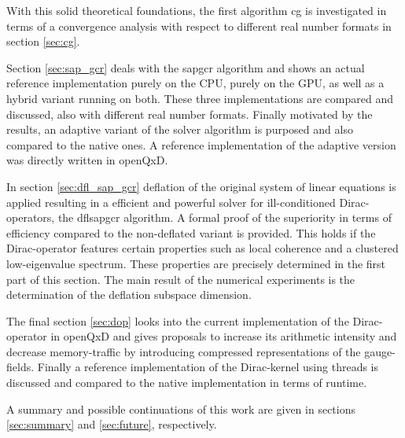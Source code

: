 \documentclass{article}
\theoremstyle{plain} %
\theoremstyle{convention} %
\theoremstyle{remark} %
\numberwithin{equation}{section}
\begin{document}
With this solid theoretical foundations, the first algorithm \acrlong{cg} is investigated in terms of a convergence analysis with respect to different real number formats in section \ref{sec:cg}.

Section \ref{sec:sap_gcr} deals with the \acrlong{sapgcr} algorithm and shows an actual reference implementation purely on the CPU, purely on the GPU, as well as a hybrid variant running on both. These three implementations are compared and discussed, also with different real number formats. Finally motivated by the results, an adaptive variant of the solver algorithm is purposed and also compared to the native ones. A reference implementation of the adaptive version was directly written in openQxD.

In section \ref{sec:dfl_sap_gcr} deflation of the original system of linear equations is applied resulting in a efficient and powerful solver for ill-conditioned Dirac-operators, the \acrlong{dflsapgcr} algorithm. A formal proof of the superiority in terms of efficiency compared to the non-deflated variant is provided. This holds if the Dirac-operator features certain properties such as local coherence and a clustered low-eigenvalue spectrum. These properties are precisely determined in the first part of this section. The main result of the numerical experiments is the determination of the deflation subspace dimension.

The final section \ref{sec:dop} looks into the current implementation of the Dirac-operator in openQxD and gives proposals to increase its arithmetic intensity and decrease memory-traffic by introducing compressed representations of the gauge-fields. Finally a reference implementation of the Dirac-kernel using threads is discussed and compared to the native implementation in terms of runtime.

A summary and possible continuations of this work are given in sections \ref{sec:summary} and \ref{sec:future}, respectively.
\end{document}

